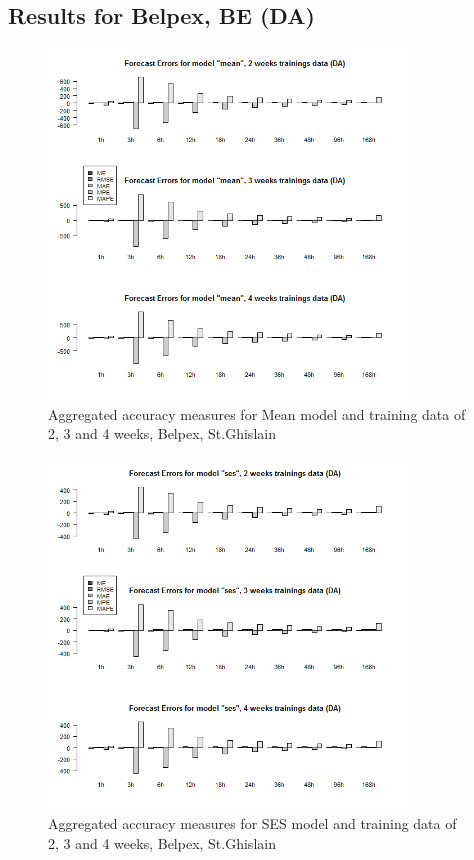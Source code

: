 \FloatBarrier
\subsection{Results for Belpex, BE (DA)} \label{ssec:app_graphs_belpex}


\begin{figure}[!ht]
	\centering
		\includegraphics[width=0.85\textwidth]{figures/appendix_forecast_results/da_sim_2_x_1w_1w_mean.png}
	\caption{Aggregated accuracy measures for Mean model and training data of 2, 3 and 4 weeks, Belpex, St.Ghislain}
	\label{fig:app_da_sim_2_x_1w_1w_mean}
\end{figure}



\begin{figure}[!ht]
	\centering
	\vspace*{-1.2in}
		\includegraphics[width=0.85\textwidth]{figures/appendix_forecast_results/da_sim_2_x_1w_1w_ses.png}
	\caption{Aggregated accuracy measures for SES model and training data of 2, 3 and 4 weeks, Belpex, St.Ghislain}
	\label{fig:app_da_sim_2_x_1w_1w_ses}
\end{figure}

